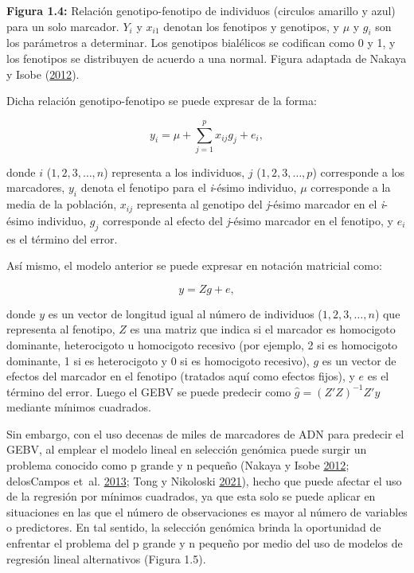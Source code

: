 \documentclass[11pt,spanish,a4paper,oneside,]{book} %
\begin{document}
\begin{center}
\textbf{Figura 1.4:} Relación genotipo-fenotipo de individuos (circulos amarillo y azul) para un solo marcador. \(Y_{i}\) y \(x_{i1}\) denotan los fenotipos y genotipos, y \(\mu\) y \(g_{i}\) son los parámetros a determinar. Los genotipos bialélicos se codifican como 0 y 1, y los fenotipos se distribuyen de acuerdo a una normal. Figura adaptada de Nakaya y Isobe (\protect\hyperlink{ref-cite:6}{2012}).

\end{center}

Dicha relación genotipo-fenotipo se puede expresar de la forma:

\begin{equation}
y_{i} = \mu + \sum_{j = 1}^{p}x_{ij}g_{j} + e_{i},
\end{equation}

donde \(i\) (\(1, 2, 3, …, n\)) representa a los individuos, \(j\) (\(1, 2, 3, …, p\)) corresponde a los marcadores, \(y_{i}\) denota el fenotipo para el \emph{i}-ésimo individuo, \(\mu\) corresponde a la media de la población, \(x_{ij}\) representa al genotipo del \emph{j}-ésimo marcador en el \emph{i}-ésimo individuo, \(g_{j}\) corresponde al efecto del \emph{j}-ésimo marcador en el fenotipo, y \(e_{i}\) es el término del error.

Así mismo, el modelo anterior se puede expresar en notación matricial como:

\begin{equation}
y = Zg + e,
\end{equation}

donde \(y\) es un vector de longitud igual al número de individuos (\(1, 2, 3, …, n\)) que representa al fenotipo, \(Z\) es una matriz que indica si el marcador es homocigoto dominante, heterocigoto u homocigoto recesivo (por ejemplo, 2 si es homocigoto dominante, 1 si es heterocigoto y 0 si es homocigoto recesivo), \(g\) es un vector de efectos del marcador en el fenotipo (tratados aquí como efectos fijos), y \(e\) es el término del error. Luego el GEBV se puede predecir como \(\hat{g} = (Z'Z)^{- 1} Z'y\) mediante mínimos cuadrados.

Sin embargo, con el uso decenas de miles de marcadores de ADN para predecir el GEBV, al emplear el modelo lineal en selección genómica puede surgir un problema conocido como p grande y n pequeño (Nakaya y Isobe \protect\hyperlink{ref-cite:6}{2012}; delosCampos et~al. \protect\hyperlink{ref-cite:31}{2013}; Tong y Nikoloski \protect\hyperlink{ref-cite:7}{2021}), hecho que puede afectar el uso de la regresión por mínimos cuadrados, ya que esta solo se puede aplicar en situaciones en las que el número de observaciones es mayor al número de variables o predictores. En tal sentido, la selección genómica brinda la oportunidad de enfrentar el problema del p grande y n pequeño por medio del uso de modelos de regresión lineal alternativos (Figura 1.5).
\end{document}
